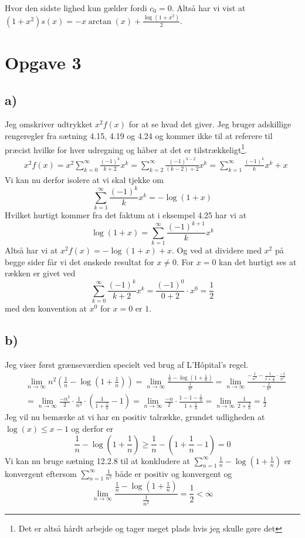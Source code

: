 \documentclass{article}
\newcommand{\lr}[1]{\left( #1\right)}
\begin{document}
Hvor den sidste lighed kun gælder fordi $c_0 = 0$.
Altså har vi vist at $(1 + x^2) s(x) = -x\arctan(x) + \frac{\log(1+x^2)}{2}$.

\section*{Opgave 3}
\subsection*{a)}
Jeg omskriver udtrykket $x^2f(x)$ for at se hvad det giver. Jeg bruger adskillige rengeregler
fra sætning 4.15, 4.19 og 4.24 \cite{an1} og kommer ikke til at referere til præcist hvilke for hver udregning
og håber at det er tilstrækkeligt\footnote{Det er altså hårdt arbejde og tager meget plads hvis jeg skulle gøre det}.
\begin{align*}
    &x^2 f(x) = x^2 \sum_{k=0}^{\infty} \frac{(-1)^k}{k+2} x^k 
    = \sum_{k=2}^{\infty} \frac{(-1)^{k-2}}{(k-2)+2} x^{k}
    = \sum_{k=1}^{\infty} \frac{(-1)^{k}}{k} x^{k} + x
\end{align*}
Vi kan nu derfor isolere at vi skal tjekke om
\[
    \sum_{k=1}^{\infty} \frac{(-1)^{k}}{k} x^{k} = -\log(1+x)
\]
Hvilket hurtigt kommer fra det faktum at i eksempel 4.25 \cite{an1} har vi at
\[
    \log(1+x) = \sum_{k=1}^{\infty} \frac{(-1)^{k+1}}{k} x^{k}
\]
Altså har vi at $x^2f(x) = -\log(1+x) + x$. Og ved at dividere med $x^2$ på begge sider
får vi det ønskede resultat for $x \ne 0$. 
For $x=0$ kan det hurtigt ses at rækken er givet ved
\[
    \sum_{k=0}^{\infty} \frac{(-1)^k}{k+2} x^k = \frac{(-1)^0}{0+2} \cdot x^0 = \frac{1}{2}
\]
med den konvention at $x^0$ for $x=0$ er $1$.

\subsection*{b)}
Jeg viser først grænseværdien specielt ved brug af L'Hôpital's regel.
\begin{align*}
    &\lim_{n \to \infty} n^2 \lr{ \frac{1}{n} - \log(1 + \frac{1}{n})}
    =\lim_{n \to \infty}  \frac{\frac{1}{n} - \log(1 + \frac{1}{n})}{\frac{1}{n^2}}
    =\lim_{n \to \infty}  \frac{-\frac{1}{n^2} - \frac{1}{1+ \frac{1}{n}} \cdot \frac{-1}{n^2}}{-\frac{2}{n^3}} \\
    &=\lim_{n \to \infty}  \frac{-n^3}{2} \cdot \frac{1}{n^2} \cdot \lr{\frac{1}{1+\frac{1}{n}} - 1}
    =\lim_{n \to \infty}  \frac{-n}{2} \cdot \frac{1 - 1 - \frac{1}{n}}{1+\frac{1}{n}}
    =\lim_{n \to \infty}  \frac{1}{2 + \frac{2}{n}} = \frac{1}{2}
\end{align*}
Jeg vil nu bemærke at vi har en positiv talrække, grundet udligheden at 
$\log(x) \le x-1$ og derfor er 
\[
    \frac{1}{n} - \log(1 + \frac{1}{n}) \ge \frac{1}{n} - (1 + \frac{1}{n} - 1) = 0
\] 
Vi kan nu bruge sætning 12.2.8 \cite{tl} til at konkludere at 
$\sum_{n=1}^{\infty} \frac{1}{n} - \log(1 + \frac{1}{n})$ er konvergent eftersom
$\sum_{n=1}^{\infty} \frac{1}{n^2}$ både er positiv og konvergent \cite[Eks. 2.23]{an1} og
\[
    \lim_{n \to \infty} \frac{\frac{1}{n} - \log(1 + \frac{1}{n})}{\frac{1}{n^2}} = \frac{1}{2} < \infty
\]
\end{document}
